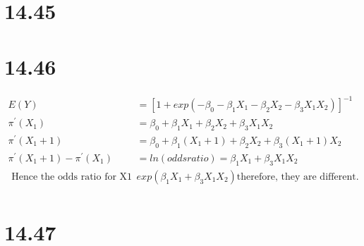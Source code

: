 \documentclass{article}\usepackage[]{graphicx}\usepackage[]{color}
\begin{document}
\section{14.45}

\section{14.46}

\begin{displaymath}
\begin{split}
  E(Y) &= [1 + exp(-\beta_0-\beta_1 X_1 - \beta_2 X_2 - \beta_3 X_1 X_2)]^{-1} \\
  \pi^{'}(X_1)  &= \beta_0 + \beta_1 X_1 + \beta_2 X_2 + \beta_3 X_1 X_2 \\
  \pi^{'}(X_1 + 1)  &= \beta_0 + \beta_1 (X_1 + 1) + \beta_2 X_2 + \beta_3 (X_1 + 1) X_2 \\ 
  \pi^{'}(X_1 + 1) - \pi^{'}(X_1) &= ln(odds ratio) = \beta_1 X_1 + \beta_3 X_1 X_2\\
  \text{ Hence the odds ratio for X1 is } & exp(\beta_1 X_1 + \beta_3 X_1 X_2) \text{therefore, they are different.} \\
\end{split}
\end{displaymath}

\section{14.47}
\end{document}
